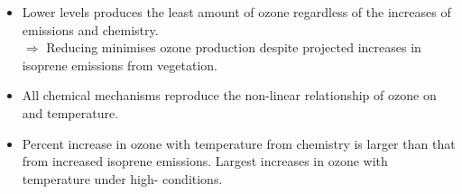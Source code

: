 \begin{BlueBox}
    \vskip-1cm
    \begin{block}{}
        \begin{itemize}
            \item Lower  levels produces the least amount of ozone regardless of the increases of emissions and chemistry. \\ \vspace{5mm} $\Rightarrow$ Reducing  minimises ozone production despite projected increases in isoprene emissions from vegetation. \vspace{10mm}
            \item All chemical mechanisms reproduce the non-linear relationship of ozone on  and temperature. \vspace{15mm}
            \item Percent increase in ozone with temperature from chemistry is larger than that from increased isoprene emissions. Largest increases in ozone with temperature under high- conditions. \vspace{15mm}
        \end{itemize}        
    \end{block}
\end{BlueBox}
